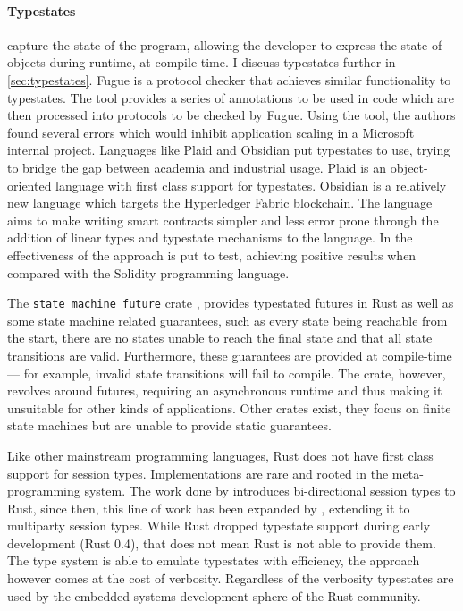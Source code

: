 \paragraph{Typestates} capture the state of the program,
allowing the developer to express the state of objects during runtime, at compile-time. %
I discuss typestates further in \autoref{sec:typestates}.
Fugue \autocite{DeLine2004} is a protocol checker that achieves similar functionality to typestates.
The tool provides a series of annotations to be used in code which are then processed into protocols to be checked by Fugue.
Using the tool, the authors found several errors which would inhibit application scaling in a Microsoft internal project.
Languages like Plaid \autocite{Aldrich2009} and Obsidian \autocite{Coblenz2020, Coblenz2020a} put typestates to use,
trying to bridge the gap between academia and industrial usage.
Plaid is an object-oriented language with first class support for typestates.
Obsidian is a relatively new language which targets the Hyperledger Fabric blockchain.
The language aims to make writing smart contracts simpler and less error prone
through the addition of linear types and typestate mechanisms to the language.
In \autocite{Coblenz2020} the effectiveness of the approach is put to test,
achieving positive results when compared with the Solidity programming language.

The \texttt{state\_machine\_future} crate \autocite{Fitzgerald2019}, provides typestated futures in Rust as well as some state machine related guarantees,
such as every state being reachable from the start,
there are no states unable to reach the final state and that all state transitions are valid.
Furthermore, these guarantees are provided at compile-time --- for example, invalid state transitions will fail to compile.
The crate, however, revolves around futures, requiring an asynchronous runtime and thus making it unsuitable for other kinds of applications.
Other crates exist, they focus on finite state machines but are unable to provide static guarantees.

Like other mainstream programming languages, Rust does not have first class support for session types.
Implementations are rare and rooted in the meta-programming system.
The work done by \autocite{Jespersen2015, Munksgaard2015} introduces bi-directional session types to Rust,
since then, this line of work has been expanded by \autocite{Lagaillardie2020}, extending it to multiparty session types.
While Rust dropped typestate support during early development (Rust 0.4), that does not mean Rust is not able to provide them.
The type system is able to emulate typestates with efficiency, the approach however comes at the cost of verbosity.
Regardless of the verbosity typestates are used by the embedded systems development sphere of the Rust community.


